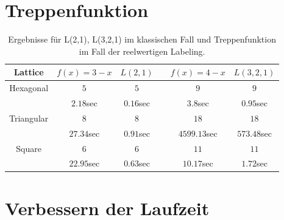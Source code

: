 \documentclass[
	fontsize=12pt,
	paper=a4,
	twoside=false,
	numbers=noenddot,
	plainheadsepline,
	toc=listof,
	toc=bibliography
]{scrartcl}
\begin{document}
\FloatBarrier	

\newpage
\section{Treppenfunktion}
\begin{table}[htbp]
\centering
\begin{tabular}{|c|c|c|c|c|c|}
\hline 
	Lattice   & $ f(x)=3-x$  & $L(2,1)$   & & $f(x)=4-x$    & $L(3,2,1)$\\ \hline 
	
	Hexagonal &  $5$	     & $5$         & & $9$            & $9$       \\ 
			  &  $2.18$sec   & $0.16$sec   & & $3.8$sec       & $0.95$sec \\ \hline
			  
	Triangular& $8$	         & $8$        & & $18$          & $18$        \\ 
			  & $27.34$sec   & $0.91$sec  & & $4599.13$sec  & $573.48$sec  \\ \hline
			  
	Square    &  $6$	     & $6$        & & $11$          & $11$        \\ 
			  &  $22.95$sec  & $0.63$sec  & & $10.17$sec    & $1.72$sec   \\ \hline
\end{tabular}
\caption{ Ergebnisse für L(2,1), L(3,2,1) im klassischen Fall und Treppenfunktion im Fall der
	reelwertigen Labeling.} 
\label{Table:T2}
\end{table}


\FloatBarrier	

\newpage
\section{Verbessern der Laufzeit}
\end{document}

